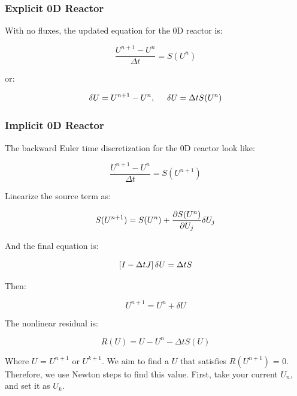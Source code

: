 \documentclass[10pt]{article}
\begin{document}
\begin{flushleft}
\subsubsection{Explicit 0D Reactor}

With no fluxes, the updated equation for the 0D reactor is:

\begin{equation}
    \frac{U^{n+1} - U^n}{\Delta t} = S(U^n)
\end{equation}

or:

\begin{equation}
    \delta U = U^{n+1} - U^n, \hspace{5mm} \delta U = \Delta t S(U^n)
\end{equation}

\subsubsection{Implicit 0D Reactor}

The backward Euler time discretization for the 0D reactor look like:

\begin{equation}
    \frac{U^{n+1} - U^n}{\Delta t} = S(U^{n+1})
\end{equation}

Linearize the source term as:

\begin{equation}
    S(U^{n+1}) = S(U^n) + \frac{\partial S(U^n)}{\partial U_j} \delta U_j
\end{equation}

And the final equation is:

\begin{equation}
    \left[ I - \Delta t J \right] \delta U = \Delta t S
\end{equation}

Then:

\begin{equation}
    U^{n+1} = U^n + \delta U
\end{equation}

The nonlinear residual is:

\begin{equation}
    R(U) = U - U^n - \Delta t S(U)
\end{equation}

Where $U$ = $U^{n+1}$ or $U^{k+1}$. We aim to find a $U$ that satisfies $R(U^{n+1})$ = 0. Therefore, we use Newton steps to find this value. First, take your current $U_n$, and set it as $U_k$. 


\end{flushleft}
\end{document}
